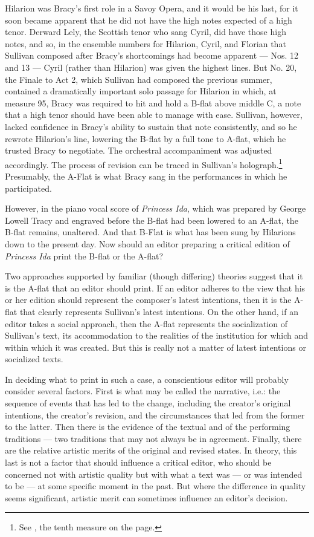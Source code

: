\begin{paper}
Hilarion was Bracy's first role in a Savoy Opera, and it would be his
last, for it soon became apparent that he did not have the high notes
expected of a high tenor. Derward Lely, the Scottish tenor who sang
Cyril, did have those high notes, and so, in the ensemble numbers for
Hilarion, Cyril, and Florian that Sullivan composed after Bracy's
shortcomings had become apparent --- Nos. 12 and 13 --- Cyril (rather than
Hilarion) was given the highest lines. But No. 20, the Finale to Act 2,
which Sullivan had composed the previous summer, contained a
dramatically important solo passage for Hilarion in which, at measure
95, Bracy was required to hit and hold a B-flat above middle C, a note
that a high tenor should have been able to manage with ease. Sullivan,
however, lacked confidence in Bracy's ability to sustain that note
consistently, and so he rewrote Hilarion's line, lowering the B-flat by
a full tone to A-flat, which he trusted Bracy to negotiate. The
orchestral accompaniment was adjusted accordingly. The process of
revision can be traced in Sullivan's holograph.\footnote{See \citealt[fol. 118\textsuperscript{r}]{sullivan_princess_1883}, the tenth measure on the page.}
Presumably, the A-Flat is what Bracy sang in the performances in which
he participated.

However, in the piano vocal score of \emph{Princess Ida}, which was
prepared by George Lowell Tracy and engraved before the B-flat had been
lowered to an A-flat, the B-flat remains, unaltered. And that B-Flat is
what has been sung by Hilarions down to the present day. Now should an editor preparing a critical edition of \emph{Princess Ida}
print the B-flat or the A-flat?

Two approaches supported by familiar (though differing) theories suggest
that it is the A-flat that an editor should print. If an editor adheres
to the view that his or her edition should represent the composer's
latest intentions, then it is the A-flat that clearly represents
Sullivan's latest intentions. On the other hand, if an editor takes a
social approach, then the A-flat represents the socialization of
Sullivan's text, its accommodation to the realities of the institution
for which and within which it was created. But this is really not a
matter of latest intentions or socialized texts.

In deciding what to print in such a case, a conscientious editor will
probably consider several factors. First is what may be called the
narrative, i.e.: the sequence of events that has led to the change,
including the creator's original intentions, the creator's revision, and
the circumstances that led from the former to the latter. Then there is
the evidence of the textual and of the performing traditions --- two
traditions that may not always be in agreement. Finally, there are the
relative artistic merits of the original and revised states. In theory,
this last is not a factor that should influence a critical editor, who
should be concerned not with artistic quality but with what a text
was --- or was intended to be --- at some specific moment in the past. But
where the difference in quality seems significant, artistic merit can
sometimes influence an editor's decision.


\end{paper}
